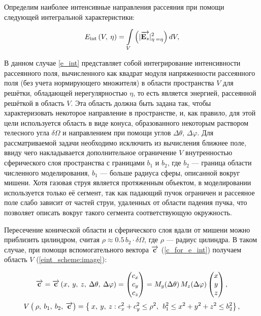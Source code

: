 Определим наиболее интенсивные направления рассеяния при помощи следующей интегральной характеристики: %

    \begin{equation}
        E_{\textrm{int}} \left(V, \:\eta\right) = \int\limits_{V} \left( |\overrightarrow{\textbf{E}_{s}}|^2_{\eta \:= \eta} \right) dV,
        \label{e_int}
    \end{equation}

В данном случае \autoref{e_int} представляет собой интегрирование интенсивности рассеянного поля, вычисленного как квадрат модуля напряженности рассеянного поля (без учета нормирующего множителя) в области пространства $V$ для решётки, обладающей нерегулярностью $\eta$, то есть является энергией, рассеянной решёткой в область $V$. Эта область должна быть задана так, чтобы характеризовать некоторое направление в пространстве, и, как правило, для этой цели используется область в виде конуса, образованного некоторым раствором телесного угла $\delta \Omega$ и направлением при помощи углов $\Delta \theta$, $\Delta \varphi$. Для рассматриваемой задачи необходимо исключить из вычисления ближнее поле, ввиду чего накладывается дополнительное ограничение $V$ внутренностью сферического слоя пространства с границами $b_1$ и $b_2$, где $b_2$ --- граница области численного моделирования, $b_1$ --- больше радиуса сферы, описанной вокруг мишени. Хотя газовая струя является протяженным объектом, в моделировании используется только её сегмент, так как падающий пучок ограничен и рассеяное поле слабо зависит от частей струи, удаленных от области падения пучка, что позволяет описать вокруг такого сегмента соответствующую окружность.

Пересечение конической области и сферического слоя вдали от мишени можно приблизить цилиндром, считая $\rho \approx 0.5\,b_2\cdot\delta \Omega$, где $\rho$ --- радиус цилиндра. В таком случае, при помощи вспомогательного вектора $\overrightarrow{\textbf{c}_{}}$ (\autoref{c_for_e_int}) получаем область $V$ (\autoref{eint_scheme:image}):

    \begin{align}
        \overrightarrow{\textbf{c}_{}} = \overrightarrow{\textbf{c}_{}}\left(x,\:y,\:z,\:\Delta \theta,\:\Delta \varphi \right) = \begin{pmatrix}c_{x}\\c_{y}\\c_{z}\end{pmatrix} = M_y(\Delta \theta)\,M_z(\Delta \varphi)\begin{pmatrix}x\\y\\z\end{pmatrix},
        \label{c_for_e_int}
    \end{align}
    \begin{align}
        V\left(\:\rho, \:b_1, \:b_2, \:\overrightarrow{\textbf{c}_{}} \right) = \left\{\:x,\:y,\:z : c_{x}^2 + c_{y}^2 \leq \rho^2, \:\: b_1^2 \leq x^2 + y^2 + z^2 \leq b_2^2 \right\},
        \label{V_for_e_int}
    \end{align}

